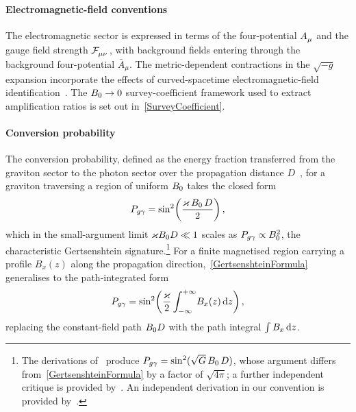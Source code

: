 \paragraph*{Electromagnetic-field conventions}
The electromagnetic sector is expressed in terms of the
four-potential $\FieldA{_\mu}$ and the gauge field strength
$\FieldF{_{\mu\nu}}$, with background fields entering through the
background four-potential $\bar{A}_\mu$. The metric-dependent
contractions in the $\sqrt{-g}$ expansion incorporate the effects
of curved-spacetime electromagnetic-field
identification~\cite{hwangnoh2023emdef,hwangnoh2023graviton}. The
$B_0 \to 0$ survey-coefficient framework used to extract
amplification ratios is set out in~\cref{SurveyCoefficient}.

\paragraph*{Conversion probability}
The conversion probability, defined as the energy fraction
transferred from the graviton sector to the photon sector over
the propagation distance $D$~\cite{raffelt1988mixing}, for
a graviton traversing a region of uniform $B_0$ takes
the closed form~\cite{raffelt1988mixing,lella2024constraining}
\begin{align}
  P_{g\gamma} = \sin^2\!\left(\frac{\varkappa\,B_0\,D}{2}\right),
  \label{GertsenshteinFormula}
\end{align}
which in the small-argument limit $\varkappa B_0 D \ll 1$ scales as
$P_{g\gamma} \propto B_0^2$, the characteristic Gertsenshtein
signature.\footnote{%
    The derivations of~\cite{palessandro2023simple,palessandro2024gertsenshtein}
    produce $P_{g\gamma} = \sin^2(\sqrt{G}\,B_0\,D)$, whose argument differs
    from~\cref{GertsenshteinFormula} by a factor of $\sqrt{4\pi}$;
    a further independent critique is provided by~\cite{hwangnoh2023graviton}.
    An independent derivation in our convention is
    provided by~\cite{lella2024constraining}.}
For a finite magnetised region carrying a profile
$B_x(z)$ along the propagation direction,~\cref{GertsenshteinFormula}
generalises to the path-integrated form~\cite{raffelt1988mixing,lella2024constraining}
\begin{align}
  P_{g\gamma} = \sin^2\!\left(
    \frac{\varkappa}{2}\int_{-\infty}^{+\infty}\!B_x(z)\,\mathrm{d} z\right),
  \label{PathIntegratedFormula}
\end{align}
replacing the
constant-field path $B_0 D$ with the path integral
$\int B_x\,\mathrm{d} z$.
